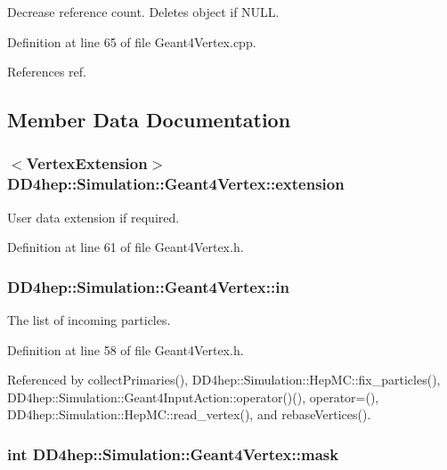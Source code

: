 Decrease reference count. Deletes object if NULL. 

Definition at line 65 of file Geant4Vertex.cpp.

References ref.

\subsection{Member Data Documentation}
\hypertarget{class_d_d4hep_1_1_simulation_1_1_geant4_vertex_ae8dbe294b3aa5ef164d5a8e5b4c7895c}{
\subsubsection[{extension}]{$<${\bf VertexExtension}$>$ {\bf DD4hep::Simulation::Geant4Vertex::extension}}}
\label{class_d_d4hep_1_1_simulation_1_1_geant4_vertex_ae8dbe294b3aa5ef164d5a8e5b4c7895c}


User data extension if required. 

Definition at line 61 of file Geant4Vertex.h.\hypertarget{class_d_d4hep_1_1_simulation_1_1_geant4_vertex_acf382e2d22907f72105b2a107e167327}{
\subsubsection[{in}]{ {\bf DD4hep::Simulation::Geant4Vertex::in}}}
\label{class_d_d4hep_1_1_simulation_1_1_geant4_vertex_acf382e2d22907f72105b2a107e167327}


The list of incoming particles. 

Definition at line 58 of file Geant4Vertex.h.

Referenced by collectPrimaries(), DD4hep::Simulation::HepMC::fix\_\-particles(), DD4hep::Simulation::Geant4InputAction::operator()(), operator=(), DD4hep::Simulation::HepMC::read\_\-vertex(), and rebaseVertices().\hypertarget{class_d_d4hep_1_1_simulation_1_1_geant4_vertex_acd55879e69a2b47c68af29904abb584a}{
\subsubsection[{mask}]{\setlength{\rightskip}{0pt plus 5cm}int {\bf DD4hep::Simulation::Geant4Vertex::mask}}}
\label{class_d_d4hep_1_1_simulation_1_1_geant4_vertex_acd55879e69a2b47c68af29904abb584a}


